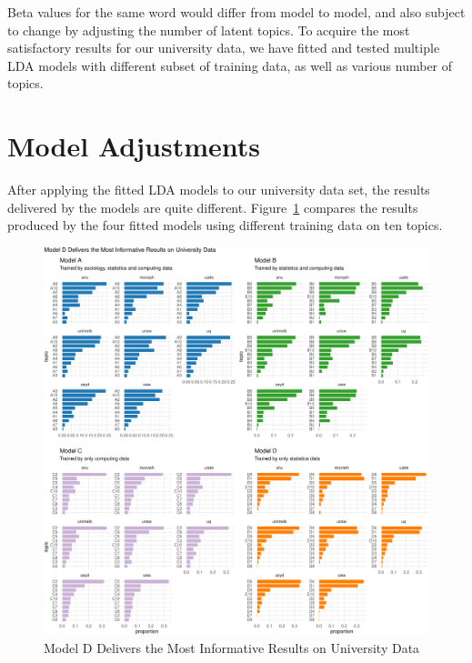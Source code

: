 \documentclass[
  letterpaper,
]{report}
\begin{document}
Beta values for the same word would differ from model to model, and also
subject to change by adjusting the number of latent topics. To acquire
the most satisfactory results for our university data, we have fitted
and tested multiple LDA models with different subset of training data,
as well as various number of topics.

\hypertarget{model-adjustments}{%
\section*{Model Adjustments}\label{model-adjustments}}

After applying the fitted LDA models to our university data set, the
results delivered by the models are quite different.
Figure~\ref{fig-com} compares the results produced by the four fitted
models using different training data on ten topics.

\begin{figure}

{\centering \includegraphics{./04-text2vec_files/figure-pdf/fig-com-1.pdf}

}

\caption{\label{fig-com}Model D Delivers the Most Informative Results on
University Data}

\end{figure}
\end{document}

